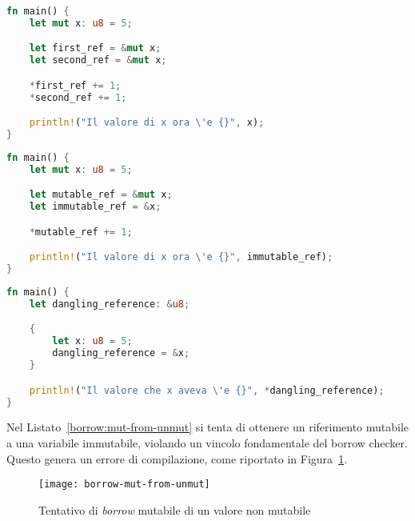\begin{lstlisting}[language=Rust, caption={Due reference mutabili alla stessa variabile}, label={borrow:two-mutable}]
fn main() {
    let mut x: u8 = 5;

    let first_ref = &mut x;
    let second_ref = &mut x;

    *first_ref += 1;
    *second_ref += 1;

    println!("Il valore di x ora \'e {}", x);
}
\end{lstlisting}

\begin{lstlisting}[language=Rust, caption={Coesistenza reference mutabile e immutabile}, label={borrow:mut-and-unmut}]
fn main() {
    let mut x: u8 = 5;

    let mutable_ref = &mut x;
    let immutable_ref = &x;

    *mutable_ref += 1;

    println!("Il valore di x ora \'e {}", immutable_ref);
}
\end{lstlisting}

\begin{lstlisting}[language=Rust, caption={Reference non valida: \textit{dangling reference}}, label={borrow:dangling-reference}]
fn main() {
    let dangling_reference: &u8;

    {
        let x: u8 = 5;
        dangling_reference = &x;
    }

    println!("Il valore che x aveva \'e {}", *dangling_reference);
}
\end{lstlisting}
Nel Listato~\ref{borrow:mut-from-unmut} si tenta di ottenere un riferimento mutabile a una variabile immutabile, violando un vincolo fondamentale del borrow checker. Questo genera un errore di compilazione, come riportato 
in Figura~\ref{borrow:mut-from-unmut-compile}.
\begin{figure}[htbp]
    \begin{center}
        \texttt{[image: borrow-mut-from-unmut]}
        \caption{Tentativo di \textit{borrow} mutabile di un valore non mutabile}\label{borrow:mut-from-unmut-compile}
    \end{center}
\end{figure}

